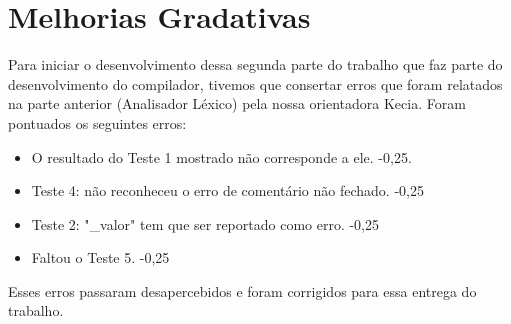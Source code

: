 \chapter{Melhorias Gradativas}
Para iniciar o desenvolvimento dessa segunda parte do trabalho que faz parte do desenvolvimento do compilador, tivemos que consertar erros que foram relatados na parte anterior (Analisador Léxico) pela nossa orientadora Kecia.
Foram pontuados os seguintes erros:

\begin{itemize}
    \item 
       O resultado do Teste 1 mostrado não corresponde a ele. -0,25.
    \item
        Teste 4: não reconheceu o erro de comentário não fechado. -0,25
    \item
        Teste 2: "{\_}valor" tem que ser reportado como erro. -0,25
    \item
    Faltou o Teste 5. -0,25
   \end{itemize}
Esses erros passaram desapercebidos e foram corrigidos para essa entrega do trabalho.